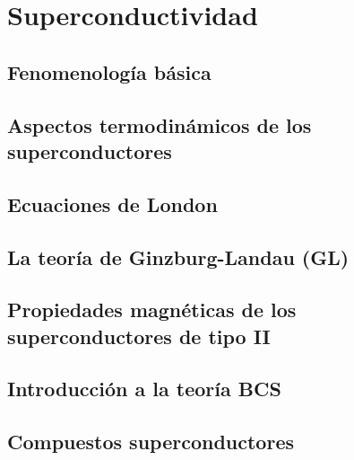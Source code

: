 \chapter{Superconductividad} \label{Ch:11}

\section{Fenomenología básica}

\section{Aspectos termodinámicos de los superconductores}

\section{Ecuaciones de London}

\section{La teoría de Ginzburg-Landau (GL)}

\section{Propiedades magnéticas de los superconductores de tipo II}

\section{Introducción a la teoría BCS}

\section{Compuestos superconductores}